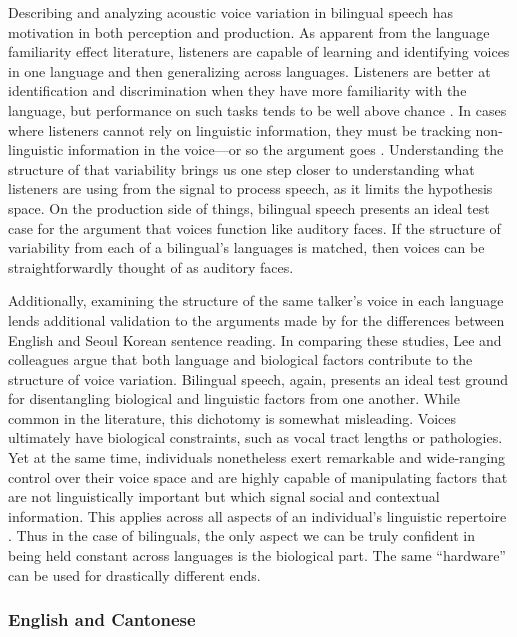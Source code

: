 Describing and analyzing acoustic voice variation in bilingual speech has motivation in both perception and production. As apparent from the language familiarity effect literature, listeners are capable of learning and identifying voices in one language and then generalizing across languages. Listeners are better at identification and discrimination when they have more familiarity with the language, but performance on such tasks tends to be well above chance \citep[e.g.,][]{orena_2019_identifying}. In cases where listeners cannot rely on linguistic information, they must be tracking non-linguistic information in the voice---or so the argument goes \citep{perrachione_2019_judgments}. Understanding the structure of that variability brings us one step closer to understanding what listeners are using from the signal to process speech, as it limits the hypothesis space. On the production side of things, bilingual speech presents an ideal test case for the argument that voices function like auditory faces. If the structure of variability from each of a bilingual's languages is matched, then voices can be straightforwardly thought of as auditory faces. 

Additionally, examining the structure of the same talker's voice in each language lends additional validation to the arguments made by \citet{lee_2020_language} for the differences between English and Seoul Korean sentence reading. In comparing these studies, Lee and colleagues argue that both language and biological factors contribute to the structure of voice variation. Bilingual speech, again, presents an ideal test ground for disentangling biological and linguistic factors from one another. While common in the literature, this dichotomy is somewhat misleading. Voices ultimately have biological constraints, such as vocal tract lengths or pathologies. Yet at the same time, individuals nonetheless exert remarkable and wide-ranging control over their voice space and are highly capable of manipulating factors that are not linguistically important but which signal social and contextual information. This applies across all aspects of an individual's linguistic repertoire \citep{bullock_2009_sociophonetics,wei_2018_translanguaging}. Thus in the case of bilinguals, the only aspect we can be truly confident in being held constant across languages is the biological part. The same ``hardware'' can be used for drastically different ends. 

\subsubsection{English and Cantonese}

